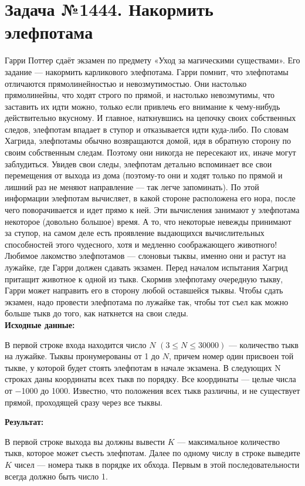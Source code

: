 \documentclass[a4paper,12pt]{article}
\begin{document}
\section*{Задача №1444. Накормить элефпотама}
Гарри Поттер сдаёт экзамен по предмету «Уход за магическими существами». Его задание — накормить карликового элефпотама. Гарри помнит, что элефпотамы отличаются прямолинейностью и невозмутимостью. Они настолько прямолинейны, что ходят строго по прямой, и настолько невозмутимы, что заставить их идти можно, только если привлечь его внимание к чему-нибудь действительно вкусному. И главное, наткнувшись на цепочку своих собственных следов, элефпотам впадает в ступор и отказывается идти куда-либо. По словам Хагрида, элефпотамы обычно возвращаются домой, идя в обратную сторону по своим собственным следам. Поэтому они никогда не пересекают их, иначе могут заблудиться. Увидев свои следы, элефпотам детально вспоминает все свои перемещения от выхода из дома (поэтому-то они и ходят только по прямой и лишний раз не меняют направление — так легче запоминать). По этой информации элефпотам вычисляет, в какой стороне расположена его нора, после чего поворачивается и идет прямо к ней. Эти вычисления занимают у элефпотама некоторое (довольно большое) время. А то, что некоторые невежды принимают за ступор, на самом деле есть проявление выдающихся вычислительных способностей этого чудесного, хотя и медленно соображающего животного!\\[0.5em]
Любимое лакомство элефпотамов — слоновьи тыквы, именно они и растут на лужайке, где Гарри должен сдавать экзамен. Перед началом испытания Хагрид притащит животное к одной из тыкв. Скормив элефпотаму очередную тыкву, Гарри может направить его в сторону любой оставшейся тыквы. Чтобы сдать экзамен, надо провести элефпотама по лужайке так, чтобы тот съел как можно больше тыкв до того, как наткнется на свои следы.\\[1em]
\textbf{Исходные данные:}
\begin{quotebox}
    В первой строке входа находится число $N$ $(3 \leq N \leq 30000)$ — количество тыкв на лужайке. Тыквы пронумерованы от 1 до $N$, причем номер один присвоен той тыкве, у которой будет стоять элефпотам в начале экзамена. В следующих N строках даны координаты всех тыкв по порядку. Все координаты — целые числа от −1000 до 1000. Известно, что положения всех тыкв различны, и не существует прямой, проходящей сразу через все тыквы.
\end{quotebox}
\textbf{Результат:}
\begin{quotebox}
    В первой строке выхода вы должны вывести $K$ — максимальное количество тыкв, которое может съесть элефпотам. Далее по одному числу в строке выведите $K$ чисел — номера тыкв в порядке их обхода. Первым в этой последовательности всегда должно быть число 1.
\end{quotebox}
\end{document}
